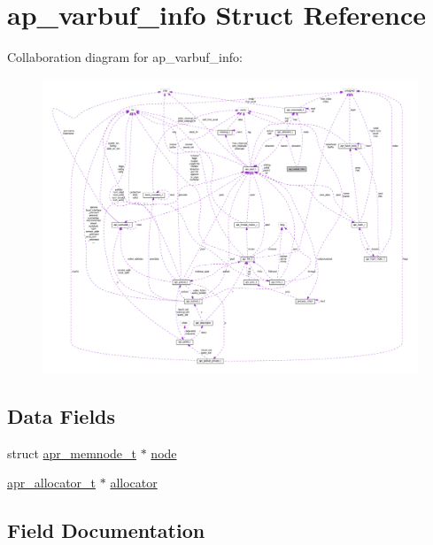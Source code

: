 \hypertarget{structap__varbuf__info}{}\section{ap\+\_\+varbuf\+\_\+info Struct Reference}
\label{structap__varbuf__info}


Collaboration diagram for ap\+\_\+varbuf\+\_\+info\+:
\nopagebreak
\begin{figure}[H]
\begin{center}
\leavevmode
\includegraphics[width=350pt]{structap__varbuf__info__coll__graph}
\end{center}
\end{figure}
\subsection*{Data Fields}
\begin{DoxyCompactItemize}
\item 
struct \hyperlink{structapr__memnode__t}{apr\+\_\+memnode\+\_\+t} $\ast$ \hyperlink{structap__varbuf__info_aaf9d76ec2d49e5887f3e3d8b1b238086}{node}
\item 
\hyperlink{structapr__allocator__t}{apr\+\_\+allocator\+\_\+t} $\ast$ \hyperlink{structap__varbuf__info_a2d4ea1c7515d4bec18877a805d8d61f7}{allocator}
\end{DoxyCompactItemize}


\subsection{Field Documentation}
